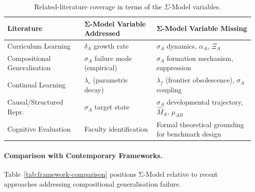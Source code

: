 \documentclass[11pt]{article}
\theoremstyle{definition}
\theoremstyle{plain}
\begin{document}
\begin{table}[htbp]
\centering
\renewcommand{\arraystretch}{1.3}
\caption{Related-literature coverage in terms of the $\Sigma$-Model
variables.}\label{tab:lit-coverage}
\begin{tabular}{>{\raggedright}p{3.5cm} >{\raggedright}p{3.5cm} >{\raggedright\arraybackslash}p{6.5cm}}
\toprule
\textbf{Literature} & \textbf{Σ-Model Variable Addressed} & \textbf{Σ-Model Variable Missing} \\
\midrule
Curriculum Learning & $\delta_A$ growth rate & $\sigma_A$ dynamics, $\alpha_A$, $\Xi_A$ \\
Compositional Generalisation & $\sigma_A$ failure mode (empirical) & $\sigma_A$ formation mechanism, suppression \\
Continual Learning & $\lambda_c$ (parametric decay) & $\lambda_f$ (frontier obsolescence), $\sigma_A$ coupling \\
Causal/Structured Repr. & $\sigma_A$ target state & $\sigma_A$ developmental trajectory, $\hat{M}_A$, $\mu_{AB}$ \\
Cognitive Evaluation & Faculty identification & Formal theoretical grounding for benchmark design \\
\bottomrule
\end{tabular}
\end{table}

\paragraph{Comparison with Contemporary Frameworks.}
Table~\ref{tab:framework-comparison} positions Σ-Model relative to recent
approaches addressing compositional generalisation failure.
\end{document}
